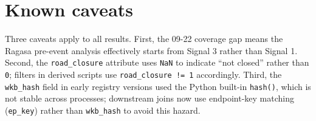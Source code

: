 \documentclass[12pt,a4paper]{report}
\begin{document}
\section{Known caveats}
Three caveats apply to all results. First, the 09-22 coverage gap means the Ragasa pre-event analysis effectively starts from Signal 3 rather than Signal 1. Second, the \texttt{road\_closure} attribute uses \texttt{NaN} to indicate ``not closed'' rather than \texttt{0}; filters in derived scripts use \texttt{road\_closure != 1} accordingly. Third, the \texttt{wkb\_hash} field in early registry versions used the Python built-in \texttt{hash()}, which is not stable across processes; downstream joins now use endpoint-key matching (\texttt{ep\_key}) rather than \texttt{wkb\_hash} to avoid this hazard.
\end{document}
